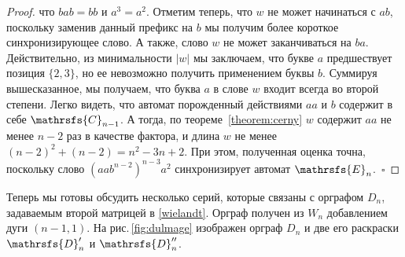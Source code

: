 \documentclass[11pt]{article}
\begin{document}
\begin{proof}
что $bab = bb$ и $a^3 = a^2$. Отметим теперь, что 
$w$ не может начинаться с $ab$, поскольку заменив данный префикс на $b$ мы получим более короткое
синхронизирующее слово. А также, слово $w$ не может заканчиваться на $ba$. Действительно, из минимальности
$|w|$ мы заключаем, что букве $a$ предшествует позиция $\{2,3\}$, но ее невозможно получить
применением буквы $b$. Суммируя вышесказанное, мы получаем, что	буква $a$ в слове $w$ входит всегда
во второй степени. Легко видеть, что автомат порожденный действиями $aa$ и $b$ содержит в себе $\mathrsfs{C}_{n - 1}$.
А тогда, по теореме~\ref{theorem:cerny} $w$ содержит $aa$ не менее $n - 2$ раз в качестве фактора, и
длина $w$ не менее $(n - 2)^2 + (n - 2) = n^2 - 3n + 2$.
При этом, полученная оценка точна, поскольку слово $(aab^{n - 2})^{n - 3}a^2$ синхронизирует автомат $\mathrsfs{E}_n$.~$\square$

\end{proof}


Теперь мы готовы обсудить несколько серий, которые связаны с орграфом $D_n$,
задаваемым второй матрицей в \eqref{wielandt}. Орграф получен из $W_n$
добавлением дуги $(n-1,1)$. На рис.\,\ref{fig:dulmage} изображен орграф $D_n$
и две его раскраски $\mathrsfs{D}'_n$ и $\mathrsfs{D}''_n$.


\end{document}
